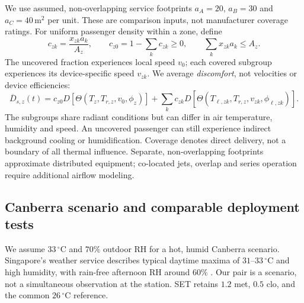 We use assumed, non-overlapping service footprints $a_A=20$, $a_B=30$ and $a_C=40\,\mathrm{m^2}$ per unit. These are comparison inputs, not manufacturer coverage ratings. For uniform passenger density within a zone, define
\begin{equation}
 c_{zk}=\frac{x_{zk}a_k}{A_z},\qquad
 c_{z0}=1-\sum_k c_{zk}\ge0,\qquad \sum_kx_{zk}a_k\le A_z.
\label{eq:coverage}
\end{equation}
The uncovered fraction experiences local speed $v_0$; each covered subgroup experiences its device-specific speed $v_{zk}$. We average \emph{discomfort}, not velocities or device efficiencies:
\begin{equation}
 \overline D_{s,z}(t)=c_{z0}D[\Theta(T_z,T_{r,z},v_0,\phi_z)]
 +\sum_k c_{zk}D[\Theta(T_{\ell,zk},T_{r,z},v_{zk},\phi_{\ell,zk})].
\label{eq:mixed-discomfort}
\end{equation}
The subgroups share radiant conditions but can differ in air temperature, humidity and speed. An uncovered passenger can still experience indirect background cooling or humidification. Coverage denotes direct delivery, not a boundary of all thermal influence. Separate, non-overlapping footprints approximate distributed equipment; co-located jets, overlap and series operation require additional airflow modeling.

\subsection{Canberra scenario and comparable deployment tests}

We assume $33\,^{\circ}\mathrm C$ and $70\%$ outdoor RH for a hot, humid Canberra scenario. Singapore's weather service describes typical daytime maxima of $31$--$33\,^{\circ}\mathrm C$ and high humidity, with rain-free afternoon RH around $60\%$ \cite{singapore-climate}. Our pair is a scenario, not a simultaneous observation at the station. SET retains $1.2$ met, $0.5$ clo, and the common $26\,^{\circ}\mathrm C$ reference.

